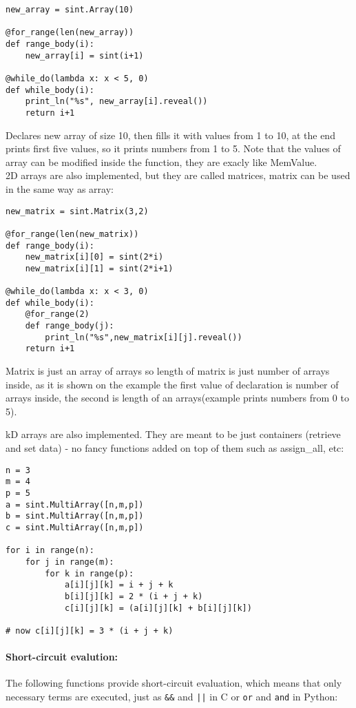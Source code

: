 \begin{lstlisting}
new_array = sint.Array(10)

@for_range(len(new_array))
def range_body(i):
    new_array[i] = sint(i+1)

@while_do(lambda x: x < 5, 0)
def while_body(i):
    print_ln("%s", new_array[i].reveal())
    return i+1
\end{lstlisting}
Declares new array of size 10, then fills it with values from 1 to 10, at the end prints first five values, so it prints numbers from 1 to 5. Note that the values of array can be modified inside the function, they are exacly like MemValue. \\
2D arrays are also implemented, but they are called matrices, matrix can be used in the same way as array:
\begin{lstlisting}
new_matrix = sint.Matrix(3,2)

@for_range(len(new_matrix))
def range_body(i):
    new_matrix[i][0] = sint(2*i)
    new_matrix[i][1] = sint(2*i+1)

@while_do(lambda x: x < 3, 0)
def while_body(i):
    @for_range(2)
    def range_body(j):
        print_ln("%s",new_matrix[i][j].reveal())
    return i+1
\end{lstlisting}
Matrix is just an array of arrays so length of matrix is just number of arrays inside, as it is shown on the example the first value of declaration is number of arrays inside, the second is length of an arrays(example prints numbers from 0 to 5).

kD arrays are also implemented. They are meant to be just containers (retrieve and set data) - no fancy functions added on top of them such as assign_all, etc:

\begin{lstlisting}
n = 3
m = 4
p = 5
a = sint.MultiArray([n,m,p])
b = sint.MultiArray([n,m,p])
c = sint.MultiArray([n,m,p])

for i in range(n):
	for j in range(m):
		for k in range(p):
			a[i][j][k] = i + j + k
			b[i][j][k] = 2 * (i + j + k)
			c[i][j][k] = (a[i][j][k] + b[i][j][k])

# now c[i][j][k] = 3 * (i + j + k)
\end{lstlisting}


\paragraph{Short-circuit evalution:}
The following functions provide short-circuit evaluation, which means
that only necessary terms are executed, just as \verb+&&+ and
\verb+||+ in C or \verb+or+ and \verb+and+ in Python:

